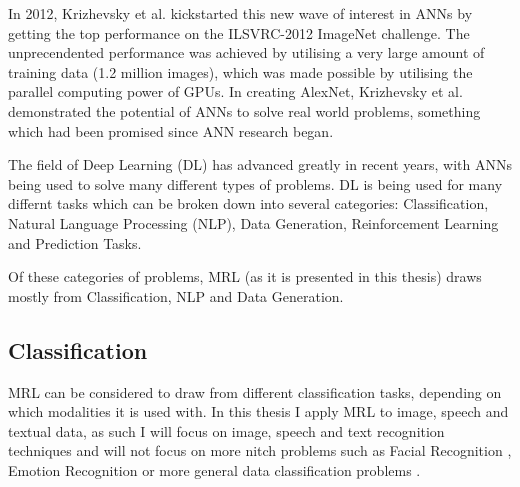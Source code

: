 In 2012, Krizhevsky et al. \cite{krizhevsky2012imagenet} kickstarted this new wave of interest in ANNs by getting the top performance on the ILSVRC-2012 ImageNet challenge. The unprecendented performance was achieved by utilising a very large amount of training data (1.2 million images), which was made possible by utilising the parallel computing power of GPUs. In creating AlexNet, Krizhevsky et al. demonstrated the potential of ANNs to solve real world problems, something which had been promised since ANN research began.

The field of Deep Learning (DL) has advanced greatly in recent years, with ANNs being used to solve many different types of problems. DL is being used for many differnt tasks which can be broken down into several categories: Classification, Natural Language Processing (NLP), Data Generation, Reinforcement Learning and Prediction Tasks.


%   
%
%   
%   
%      

Of these categories of problems, MRL (as it is presented in this thesis) draws mostly from Classification, NLP and Data Generation.

\subsection{Classification}
MRL can be considered to draw from different classification tasks, depending on which modalities it is used with. In this thesis I apply MRL to image, speech and textual data, as such I will focus on image, speech and text recognition techniques and will not focus on more nitch problems such as Facial Recognition \cite{ma2004facial}, Emotion Recognition \cite{levi2015emotion} or more general data classification problems \cite{kussul2017deep,qi2017pointnet}.


